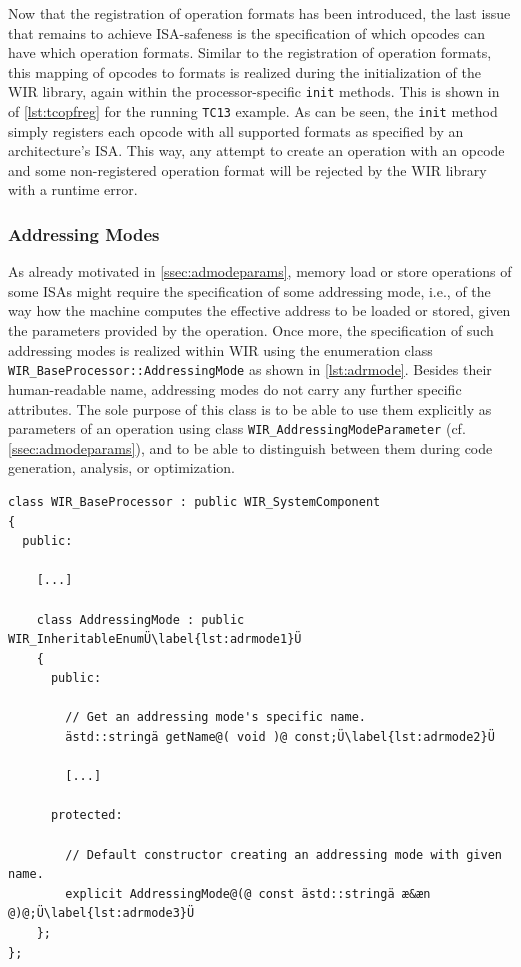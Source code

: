 Now that the registration of operation formats has been introduced, the last issue that remains to achieve \gls{ISA}-safeness is the specification of which opcodes can have which operation formats.
Similar to the registration of operation formats, this mapping of opcodes to formats is realized during the initialization of the \gls{WIR} library, again within the processor-specific \texttt{init} methods.
This is shown in  of \cref{lst:tcopfreg} for the running \texttt{TC13} example.
As can be seen, the \texttt{init} method simply registers each opcode with all supported formats as specified by an architecture's \gls{ISA}.
This way, any attempt to create an operation with an opcode and some non-registered operation format will be rejected by the \gls{WIR} library with a runtime error.


\subsubsection{Addressing Modes}
\label{sssec:amodes}

As already motivated in \cref{ssec:admodeparams}, memory load or store operations of some \glspl{ISA} might require the specification of some addressing mode, i.e., of the way how the machine computes the effective address to be loaded or stored, given the parameters provided by the operation.
Once more, the specification of such addressing modes is realized within \gls{WIR} using the enumeration class \texttt{WIR\_BaseProcessor::AddressingMode} as shown in \cref{lst:adrmode}.
Besides their human-readable name, addressing modes do not carry any further specific attributes.
The sole purpose of this class is to be able to use them explicitly as parameters of an operation using class \texttt{WIR\_AddressingModeParameter} (cf. \cref{ssec:admodeparams}), and to be able to distinguish between them during code generation, analysis, or optimization.

\begin{lstlisting}[style=code,float=t,caption={Generic Addressing Mode Handling of Class \texttt{WIR\_BaseProcessor}},label=lst:adrmode]
class WIR_BaseProcessor : public WIR_SystemComponent
{
  public:

    [...]

    class AddressingMode : public WIR_InheritableEnumÜ\label{lst:adrmode1}Ü
    {
      public:

        // Get an addressing mode's specific name.
        ästd::stringä getName@( void )@ const;Ü\label{lst:adrmode2}Ü

        [...]

      protected:

        // Default constructor creating an addressing mode with given name.
        explicit AddressingMode@(@ const ästd::stringä æ&æn @)@;Ü\label{lst:adrmode3}Ü
    };
};
\end{lstlisting}

